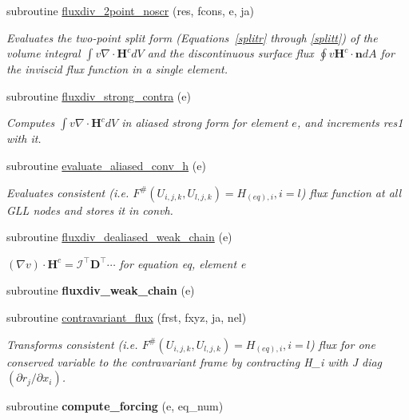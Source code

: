 \begin{DoxyCompactItemize}
\item 
subroutine \hyperlink{group__convhvol_ga72c1cbe51bc537e14ec8927e62f0e3f3}{fluxdiv\-\_\-2point\-\_\-noscr} (res, fcons, e, ja)
\begin{DoxyCompactList}\small\item\em Evaluates the two-\/point split form (Equations~\ref{splitr} through \ref{splitt}) of the volume integral $\int v \nabla\cdot\mathbf{H}^c dV$ and the discontinuous surface flux $\oint v \mathbf{H}^c\cdot\mathbf{n} dA$ for the inviscid flux function in a single element. \end{DoxyCompactList}\item 
subroutine \hyperlink{group__convhvol_gab4831bb28a78e1c8fd3ec09854bd15ad}{fluxdiv\-\_\-strong\-\_\-contra} (e)
\begin{DoxyCompactList}\small\item\em Computes $\int v \nabla\cdot\mathbf{H}^c dV$ in aliased strong form for element $e$, and increments res1 with it. \end{DoxyCompactList}\item 
subroutine \hyperlink{group__convhvol_gad9d70d83f1184d25495812d637698102}{evaluate\-\_\-aliased\-\_\-conv\-\_\-h} (e)
\begin{DoxyCompactList}\small\item\em Evaluates consistent (i.\-e. $F^{\#}(U_{i,j,k},U_{l,j,k})=H_{(eq),i},i=l$) flux function at all G\-L\-L nodes and stores it in convh. \end{DoxyCompactList}\item 
\hypertarget{group__convhvol_ga89ba8fe53f8afc523597773aca62a270}{subroutine \hyperlink{group__convhvol_ga89ba8fe53f8afc523597773aca62a270}{fluxdiv\-\_\-dealiased\-\_\-weak\-\_\-chain} (e)}\label{group__convhvol_ga89ba8fe53f8afc523597773aca62a270}

\begin{DoxyCompactList}\small\item\em $(\nabla v)\cdot \mathbf{H}^c=\mathcal{I}^{\intercal}\mathbf{D}^{\intercal}\cdots$ for equation eq, element e \end{DoxyCompactList}\item 
\hypertarget{eqnsolver__cmt_8f_a67c37779e77c6d9a630d38fe92314c23}{subroutine {\bfseries fluxdiv\-\_\-weak\-\_\-chain} (e)}\label{eqnsolver__cmt_8f_a67c37779e77c6d9a630d38fe92314c23}

\item 
subroutine \hyperlink{group__convhvol_ga72103225babeca7679ef8b9a41d08f2e}{contravariant\-\_\-flux} (frst, fxyz, ja, nel)
\begin{DoxyCompactList}\small\item\em Transforms consistent (i.\-e. $F^{\#}(U_{i,j,k},U_{l,j,k})=H_{(eq),i},i=l$) flux for one conserved variable to the contravariant frame by contracting H\-\_\-i with J diag $\left(\partial r_j/\partial x_i\right)$. \end{DoxyCompactList}\item 
\hypertarget{eqnsolver__cmt_8f_a16ab9195e1b629e65603f74643f877bb}{subroutine {\bfseries compute\-\_\-forcing} (e, eq\-\_\-num)}\label{eqnsolver__cmt_8f_a16ab9195e1b629e65603f74643f877bb}


\end{DoxyCompactItemize}
